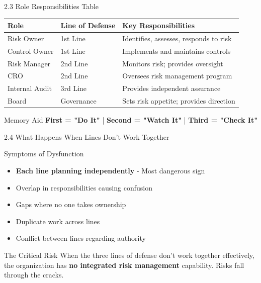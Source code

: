 \documentclass{beamer}
\begin{document}
	\begin{frame}{2.3 Role Responsibilities Table}
		\begin{table}
			\centering
			\begin{tabular}{|p{2.5cm}|p{3.5cm}|p{5cm}|}
				\hline
				\textbf{Role} & \textbf{Line of Defense} & \textbf{Key Responsibilities} \\
				\hline
				Risk Owner & 1st Line & Identifies, assesses, responds to risk \\
				\hline
				Control Owner & 1st Line & Implements and maintains controls \\
				\hline
				Risk Manager & 2nd Line & Monitors risk; provides oversight \\
				\hline
				CRO & 2nd Line & Oversees risk management program \\
				\hline
				Internal Audit & 3rd Line & Provides independent assurance \\
				\hline
				Board & Governance & Sets risk appetite; provides direction \\
				\hline
			\end{tabular}
		\end{table}
		
		\begin{exampleblock}{Memory Aid}
			\textbf{First = "Do It"} | \textbf{Second = "Watch It"} | \textbf{Third = "Check It"}
		\end{exampleblock}
	\end{frame}
	
	\begin{frame}{2.4 What Happens When Lines Don't Work Together}
		\begin{block}{Symptoms of Dysfunction}
			\begin{itemize}
				\item \textbf{Each line planning independently} - Most dangerous sign
				\item Overlap in responsibilities causing confusion
				\item Gaps where no one takes ownership
				\item Duplicate work across lines
				\item Conflict between lines regarding authority
			\end{itemize}
		\end{block}
		
		\begin{alertblock}{The Critical Risk}
			When the three lines of defense don't work together effectively, the organization has \textbf{no integrated risk management} capability. Risks fall through the cracks.
		\end{alertblock}
	\end{frame}
	
\end{document}
